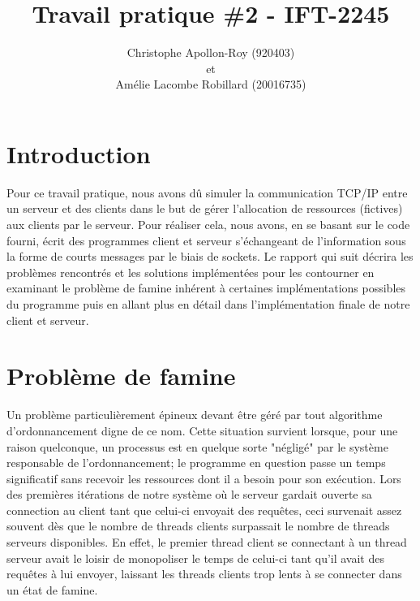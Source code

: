 \documentclass[11pt]{article}
\title{Travail pratique \#2 - IFT-2245}
\author{Christophe Apollon-Roy (920403) \\et \\Amélie Lacombe Robillard (20016735)}
\begin{document}
\maketitle
\section*{Introduction}
\setlength{\parindent}{20pt}
Pour ce travail pratique, nous avons dû simuler la communication TCP/IP entre un serveur et des clients dans le but de gérer l'allocation de 
ressources (fictives) aux clients par le serveur. Pour réaliser cela, nous avons, en se basant sur le code fourni, écrit des programmes client et 
serveur s'échangeant de l'information sous la forme de courts messages par le biais de sockets. Le rapport qui suit décrira les problèmes 
rencontrés et les solutions implémentées pour les contourner en examinant le problème de famine inhérent à certaines implémentations possibles du 
programme puis en allant plus en détail dans l'implémentation finale de notre client et serveur.
\\
\section*{Problème de famine}
\setlength{\parindent}{20pt}
Un problème particulièrement épineux devant être géré par tout algorithme d'ordonnancement digne de ce nom. Cette situation survient lorsque, pour 
une raison quelconque, un processus est en quelque sorte "négligé" par le système responsable de l'ordonnancement; le programme en question passe 
un temps significatif sans recevoir les ressources dont il a besoin pour son exécution. Lors des premières itérations de notre système où le 
serveur gardait ouverte sa connection au client tant que celui-ci envoyait des requêtes, ceci survenait assez souvent dès que le nombre de threads 
clients surpassait le nombre de threads serveurs disponibles. En effet, le premier thread client se connectant à un thread serveur avait le loisir 
de monopoliser le temps de celui-ci tant qu'il avait des requêtes à lui envoyer, laissant les threads clients trop lents à se connecter dans un 
état de famine. 
 
\end{document}

